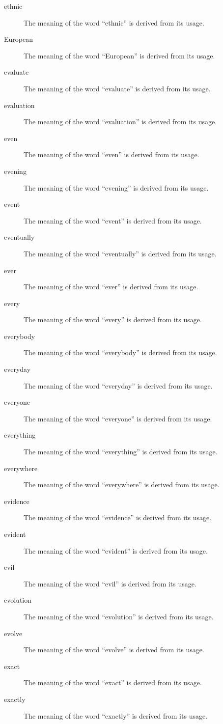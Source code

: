 \documentclass[12pt, letterpaper]{memoir}
\begin{document}
\begin{description}
\item[ethnic] The meaning of the word ``ethnic'' is derived from its usage.
\item[European] The meaning of the word ``European'' is derived from its usage.
\item[evaluate] The meaning of the word ``evaluate'' is derived from its usage.
\item[evaluation] The meaning of the word ``evaluation'' is derived from its usage.
\item[even] The meaning of the word ``even'' is derived from its usage.
\item[evening] The meaning of the word ``evening'' is derived from its usage.
\item[event] The meaning of the word ``event'' is derived from its usage.
\item[eventually] The meaning of the word ``eventually'' is derived from its usage.
\item[ever] The meaning of the word ``ever'' is derived from its usage.
\item[every] The meaning of the word ``every'' is derived from its usage.
\item[everybody] The meaning of the word ``everybody'' is derived from its usage.
\item[everyday] The meaning of the word ``everyday'' is derived from its usage.
\item[everyone] The meaning of the word ``everyone'' is derived from its usage.
\item[everything] The meaning of the word ``everything'' is derived from its usage.
\item[everywhere] The meaning of the word ``everywhere'' is derived from its usage.
\item[evidence] The meaning of the word ``evidence'' is derived from its usage.
\item[evident] The meaning of the word ``evident'' is derived from its usage.
\item[evil] The meaning of the word ``evil'' is derived from its usage.
\item[evolution] The meaning of the word ``evolution'' is derived from its usage.
\item[evolve] The meaning of the word ``evolve'' is derived from its usage.
\item[exact] The meaning of the word ``exact'' is derived from its usage.
\item[exactly] The meaning of the word ``exactly'' is derived from its usage.

\end{description}
\end{document}
